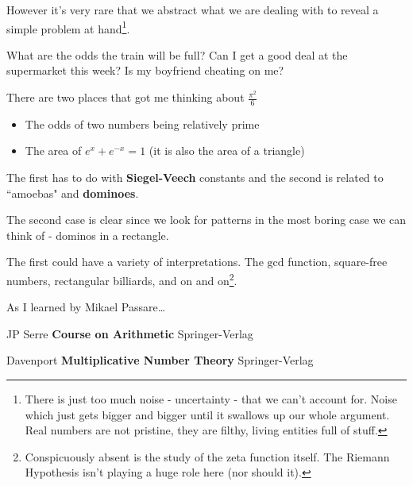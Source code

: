 \documentclass[12pt]{article}
\begin{document}
\noindent However it's very rare that we abstract what we are dealing with to reveal a simple problem at hand\footnote{There is just too much noise - uncertainty - that we can't account for.  Noise which just gets bigger and bigger until it swallows up our whole argument.  Real numbers are not pristine, they are filthy, living entities full of stuff.}.\newline

\noindent What are the odds the train will be full?  Can I get a good deal at the supermarket this week?  Is my boyfriend cheating on me?

\newpage

\noindent There are two places that got me thinking about $\frac{\pi^2}{6}$ \newline
\begin{itemize}
\item The odds of two numbers being relatively prime
\item The area of $e^x + e^{-x} = 1$ (it is also the area of a triangle)
\end{itemize}

\noindent The first has to do with \textbf{Siegel-Veech} constants and the second is related to ``amoebas" and \textbf{dominoes}. \newline \newline 

\noindent The second case is clear since we look for patterns in the most boring case we can think of - dominos in a rectangle. \newline \newline 

\noindent The first could have a variety of interpretations.  The $\mathrm{gcd}$ function, square-free numbers, rectangular billiards, and on and on\footnote{Conspicuously absent is the study of the zeta function itself.  The Riemann Hypothesis isn't playing a huge role here (nor should it).}.
\newpage

\noindent As I learned by Mikael Passare\dots


\newpage

\selectfont \fontsize{12}{10}\selectfont

\begin{thebibliography}{}

\item JP Serre \textbf{Course on Arithmetic} Springer-Verlag

\item Davenport \textbf{Multiplicative Number Theory} Springer-Verlag



\end{thebibliography}
\end{document}
